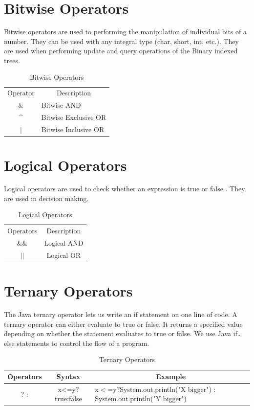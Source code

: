 \documentclass[openany]{book}  %
\begin{document}
\section{Bitwise Operators}
Bitwise operators\cite{Ref8} are used to performing the manipulation of individual bits of a number.
They can be used with any integral type (char, short, int, etc.). They are used when performing update and query operations of the Binary indexed trees.
% 
%
\begin{table}[htbp]
    \begin{tabular}{cl}
        Operator           & \multicolumn{1}{c}{Description} \\
        \&                 & Bitwise AND                     \\
        \textasciicircum{} & Bitwise Exclusive OR            \\
        $\vert$            & Bitwise Inclusive OR
    \end{tabular}
    \centering
    \caption{Bitwise Operators}
\end{table}
% 
% 
\section{Logical Operators}
Logical operators\cite{Ref8} are used to check whether an expression is true or false . They are used in decision making.
% 
%
\begin{table}[htbp]
    \begin{tabular}{cc}
        Operators      & Description \\
        \&\&           & Logical AND \\
        $\vert$$\vert$ & Logical OR
    \end{tabular}
    \centering
    \caption{Logical Operators}
\end{table}
% 
% 
\section{Ternary Operators}
The Java ternary operator\cite{Ref8} lets us write an if statement on one line of code.
A ternary operator can either evaluate to true or false.
It returns a specified value depending on whether the statement evaluates to true or false. We use Java if…else statements to control the flow of a program.
% 
%
\begin{table}[htbp]
    \footnotesize
    \begin{tabular}{|c|c|l|}
        \hline
        Operators & Syntax                    & \multicolumn{1}{c|}{Example}                                           \\ \hline
        ? :       & x\textless{}=y?true:false & x$<$=y?System.out.println("X bigger") : System.out.println("Y bigger") \\ \hline
    \end{tabular}
    \begin{center}
        \caption{Ternary Operators}
    \end{center}
\end{table}
\end{document}
